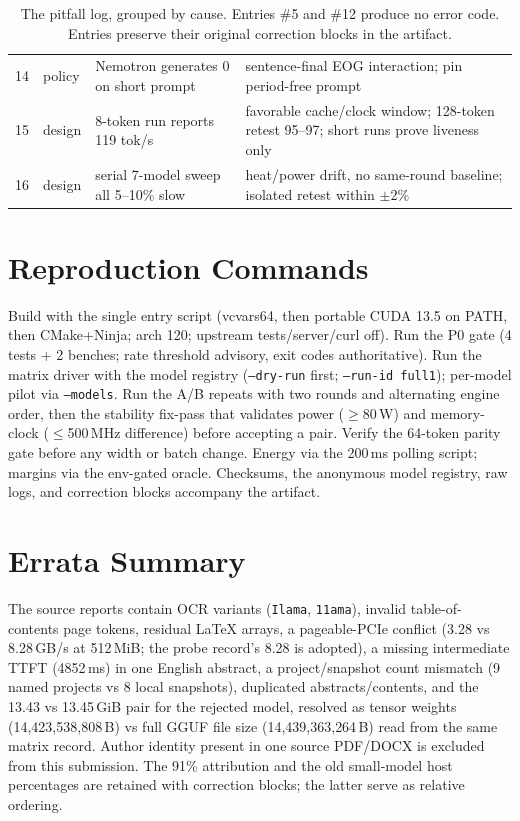 \documentclass[letterpaper,twocolumn,10pt]{article}
\begin{document}
\begin{table}[t]
\begin{tabular}{@{}clp{}p{}@{}}
14 & policy & Nemotron generates 0 on short prompt & sentence-final EOG interaction; pin period-free prompt \\
15 & design & 8-token run reports 119 tok/s & favorable cache/clock window; 128-token retest 95--97; short runs prove liveness only \\
16 & design & serial 7-model sweep all 5--10\% slow & heat/power drift, no same-round baseline; isolated retest within $\pm2\%$ \\
\bottomrule
\end{tabular}
\caption{The pitfall log, grouped by cause. Entries \#5 and \#12 produce no
error code. Entries preserve their original correction blocks in the
artifact.}
\label{tab:pits}
\end{table}

\section{Reproduction Commands}
\label{app:repro}

Build with the single entry script (vcvars64, then portable CUDA 13.5 on PATH,
then CMake+Ninja; arch 120; upstream tests/server/curl off). Run the P0 gate
(4 tests + 2 benches; rate threshold advisory, exit codes authoritative). Run
the matrix driver with the model registry (\texttt{--dry-run} first;
\texttt{--run-id full1}); per-model pilot via \texttt{--models}. Run the A/B
repeats with two rounds and alternating engine order, then the stability
fix-pass that validates power ($\ge$80\,W) and memory-clock ($\le$500\,MHz
difference) before accepting a pair. Verify the 64-token parity gate before
any width or batch change. Energy via the 200\,ms polling script; margins via
the env-gated oracle. Checksums, the anonymous model registry, raw logs, and
correction blocks accompany the artifact.

\section{Errata Summary}
\label{app:errata}

The source reports contain OCR variants (\texttt{Ilama}, \texttt{11ama}),
invalid table-of-contents page tokens, residual LaTeX arrays, a pageable-PCIe
conflict (3.28 vs 8.28\,GB/s at 512\,MiB; the probe record's 8.28 is adopted),
a missing intermediate TTFT (4852\,ms) in one English abstract, a
project/snapshot count mismatch (9 named projects vs 8 local snapshots),
duplicated abstracts/contents, and the 13.43 vs 13.45\,GiB pair for the
rejected model, resolved as tensor weights (14{,}423{,}538{,}808\,B) vs full
GGUF file size (14{,}439{,}363{,}264\,B) read from the same matrix record.
Author identity present in one source PDF/DOCX
is excluded from this submission. The 91\% attribution and the old small-model
host percentages are retained with correction blocks; the latter serve as
relative ordering.
\end{document}
